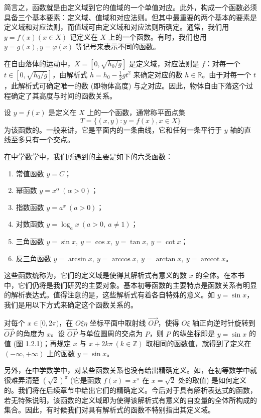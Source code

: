 \documentclass[UTF8,12pt,a4paper,fontset=fandol]{ctexbook}
\begin{document}
简言之，函数就是由定义域到它的值域的一个单值对应。此外，构成一个函数必须具备三个基本要素：定义域、值域和对应法则。但其中最重要的两个基本的要素是定义域和对应法则，而值域可由定义域和对应法则所确定。通常，我们用 $y=f(x)(x\in X)$ 记定义在 $X$ 上的一个函数。有时，我们也用 $y=g(x),y=\varphi(x)$ 等记号来表示不同的函数。

在自由落体的运动中，$X=[0,\sqrt{h_0/g}]$ 是定义域，对应法则是 $f$：对每一个 $t\in[0,\sqrt{h_0/g}]$，由解析式 $h=h_0-\frac12gt^2$ 来确定对应的数 $h\in\mathbb{R}$。由于对每一个 $t$，此解析式可确定唯一的数 (即物体高度) 与之对应。因此，物体自由下落这个过程确定了其高度与时间的函数关系。

设 $y=f(x)$ 是定义在 $X$ 上的一个函数，通常称平面点集
\[
  T=\{(x,y):y=f(x),x\in X\}
\]
为该函数的。一般来讲，它是平面内的一条曲线，它和任何一条平行于 $y$ 轴的直线至多只有一个交点。

在中学数学中，我们所遇到的主要是如下的六类函数：
\begin{enumerate}
  \item 常值函数 $y=C$；
  \item 幂函数 $y=x^\alpha\ (\alpha>0)$；
  \item 指数函数 $y=a^x\ (a>0)$；
  \item 对数函数 $y=\log_a x\ (a>0,\ a\ne1)$；
  \item 三角函数 $y=\sin x,\ y=\cos x,\ y=\tan x,\ y=\cot x$；
  \item 反三角函数 $y=\arcsin x,\ y=\arccos x,\ y=\arctan x,\ y=\operatorname{arccot} x$。
\end{enumerate}
这些函数统称为，它们的定义域是使得其解析式有意义的数 $x$ 的全体。在本书中，它们仍将是我们研究的主要对象。基本初等函数的主要特点是函数关系有明显的解析表达式。值得注意的是，这些解析式有着各自特殊的意义。如 $y=\sin x$，我们是用以下方式来确定这个函数关系的。

对每个 $x\in[0,2\pi)$，在 $O\xi\eta$ 坐标平面中取射线 $\overrightarrow{OP}$，使得 $O\xi$ 轴正向逆时针旋转到 $\overrightarrow{OP}$ 的角度为 $x$。设 $\overrightarrow{OP}$ 与单位圆周的交点为 $P$，则 $P$ 的纵坐标即是 $y=\sin x$ 的值 (图 1.2.1)；再规定 $x$ 与 $x+2k\pi\ (k\in\mathbb{Z})$ 取相同的函数值，就得到了定义在 $(-\infty,+\infty)$ 上的函数 $y=\sin x$。

另外，在中学数学中，对某些函数关系也没有给出精确定义。如，在初等数学中就很难弄清楚 $(\sqrt2)^\pi$ (它是函数 $f(x)=x^\pi$ 在 $x=\sqrt2$ 处的取值) 是如何定义的。我们将在后续章节中给出它们的精确定义。今后对于具有解析表达式的函数，若无特殊说明，该函数的定义域即为使得该解析式有意义的自变量的全体所构成的集合。因此，有时候我们对具有解析式的函数不特别指出其定义域。
\end{document}
